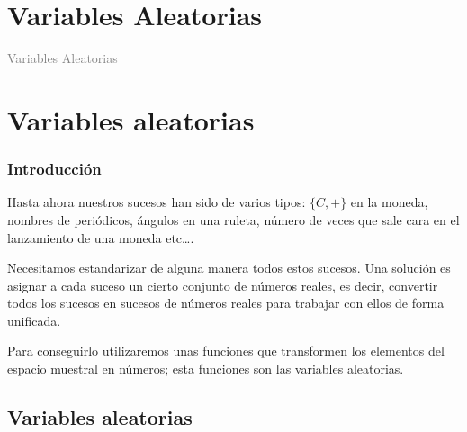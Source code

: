 \documentclass[handout]{beamer}\usepackage[]{graphicx}\usepackage[]{color}
\title[\red{Matemáticas III GINF}]{}
\author[]{R. Alberich}
\date{}
\newcommand{\gray}[1]{\textcolor{gray}{#1}}
\renewcommand{\emph}[1]{{\color{red}#1}}
\theoremstyle{plain}
\theoremstyle{definition}
\begin{document}
\beamertemplatedotitem

\lstset{breaklines=true}
\lstset{basicstyle=\ttfamily}


\section{Variables Aleatorias}

\begin{frame}
\vfill
\begin{center}
\gray{\LARGE Variables Aleatorias}
\end{center}
\vfill
\end{frame}
\section{Variables aleatorias}

\begin{frame}
\frametitle{Introducción}
Hasta ahora nuestros sucesos han sido de varios tipos: $\{C,+\}$ en
la moneda, nombres de periódicos, ángulos en una ruleta, número de
veces que sale cara en el lanzamiento de una moneda etc\ldots.

Necesitamos estandarizar de alguna manera todos estos sucesos. Una
solución es asignar a cada suceso un cierto conjunto de
números reales, es decir, convertir todos los sucesos en
\emph{sucesos de números reales} para trabajar con ellos de forma
unificada.

Para conseguirlo utilizaremos  unas funciones que
transformen los elementos del espacio muestral en números; esta funciones son las
variables aleatorias.
\end{frame}



\subsection{Variables aleatorias}
\end{document}
